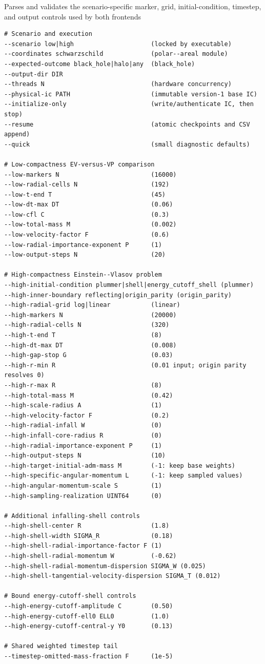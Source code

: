 {}
{Parses and validates the scenario-specific marker, grid, initial-condition,
 timestep, and output controls used by both frontends}
\begin{lstlisting}[basicstyle=\ttfamily\scriptsize]
# Scenario and execution
--scenario low|high                     (locked by executable)
--coordinates schwarzschild             (polar--areal module)
--expected-outcome black_hole|halo|any  (black_hole)
--output-dir DIR
--threads N                             (hardware concurrency)
--physical-ic PATH                      (immutable version-1 base IC)
--initialize-only                       (write/authenticate IC, then stop)
--resume                                (atomic checkpoints and CSV append)
--quick                                 (small diagnostic defaults)

# Low-compactness EV-versus-VP comparison
--low-markers N                         (16000)
--low-radial-cells N                    (192)
--low-t-end T                           (45)
--low-dt-max DT                         (0.06)
--low-cfl C                             (0.3)
--low-total-mass M                      (0.002)
--low-velocity-factor F                 (0.6)
--low-radial-importance-exponent P      (1)
--low-output-steps N                    (20)

# High-compactness Einstein--Vlasov problem
--high-initial-condition plummer|shell|energy_cutoff_shell (plummer)
--high-inner-boundary reflecting|origin_parity (origin_parity)
--high-radial-grid log|linear           (linear)
--high-markers N                        (20000)
--high-radial-cells N                   (320)
--high-t-end T                          (8)
--high-dt-max DT                        (0.008)
--high-gap-stop G                       (0.03)
--high-r-min R                          (0.01 input; origin parity resolves 0)
--high-r-max R                          (8)
--high-total-mass M                     (0.42)
--high-scale-radius A                   (1)
--high-velocity-factor F                (0.2)
--high-radial-infall W                  (0)
--high-infall-core-radius R             (0)
--high-radial-importance-exponent P     (1)
--high-output-steps N                   (10)
--high-target-initial-adm-mass M        (-1: keep base weights)
--high-specific-angular-momentum L      (-1: keep sampled values)
--high-angular-momentum-scale S         (1)
--high-sampling-realization UINT64      (0)

# Additional infalling-shell controls
--high-shell-center R                   (1.8)
--high-shell-width SIGMA_R              (0.18)
--high-shell-radial-importance-factor F (1)
--high-shell-radial-momentum W          (-0.62)
--high-shell-radial-momentum-dispersion SIGMA_W (0.025)
--high-shell-tangential-velocity-dispersion SIGMA_T (0.012)

# Bound energy-cutoff-shell controls
--high-energy-cutoff-amplitude C        (0.50)
--high-energy-cutoff-ell0 ELL0          (1.0)
--high-energy-cutoff-central-y Y0       (0.13)

# Shared weighted timestep tail
--timestep-omitted-mass-fraction F      (1e-5)
\end{lstlisting}
